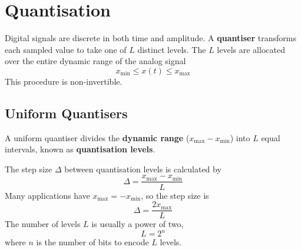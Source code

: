 \documentclass{article}
\begin{document}
\section{Quantisation}
Digital signals are discrete in both time and amplitude. A
\textbf{quantiser} transforms each sampled value to take one of \(L\) distinct levels.
The \(L\) levels are allocated over the entire dynamic range of the analog signal
\begin{equation*}
    x_\mathrm{min} \leq x\left( t \right) \leq x_\mathrm{max}
\end{equation*}
This procedure is non-invertible.
\subsection{Uniform Quantisers}
A uniform quantiser divides the \textbf{dynamic range} (\(x_\mathrm{max} - x_\mathrm{min}\)) into \(L\) equal intervals,
known as \textbf{quantisation levels}.

The step size \(\Delta\) between quantisation levels is calculated by
\begin{equation*}
    \Delta = \frac{x_\mathrm{max} - x_\mathrm{min}}{L}
\end{equation*}
Many applications have \(x_\mathrm{max} = -x_\mathrm{min}\), so the step size is
\begin{equation*}
    \Delta = \frac{2 x_\mathrm{max}}{L}
\end{equation*}
The number of levels \(L\) is usually a power of two,
\begin{equation*}
    L = 2^n
\end{equation*}
where \(n\) is the number of bits to encode \(L\) levels.
\end{document}
